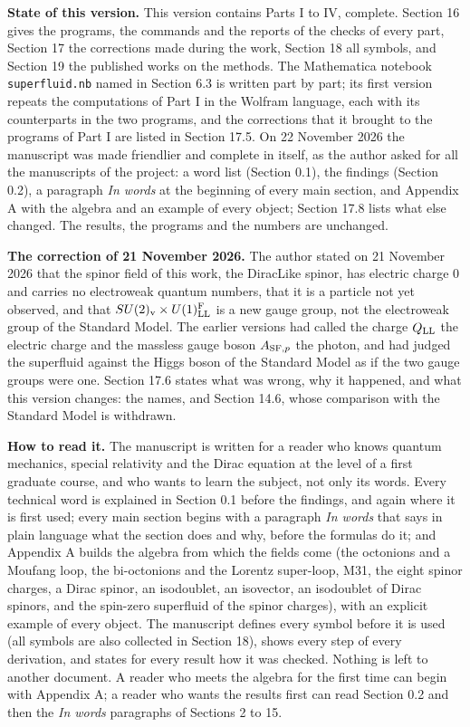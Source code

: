 \documentclass[
  10pt,
]{article}
\begin{document}
\textbf{State of this version.} This version contains Parts I to IV,
complete. Section 16 gives the programs, the commands and the reports of
the checks of every part, Section 17 the corrections made during the
work, Section 18 all symbols, and Section 19 the published works on the
methods. The Mathematica notebook \texttt{superfluid.nb} named in
Section 6.3 is written part by part; its first version repeats the
computations of Part I in the Wolfram language, each with its
counterparts in the two programs, and the corrections that it brought to
the programs of Part I are listed in Section 17.5. On 22 November 2026
the manuscript was made friendlier and complete in itself, as the author
asked for all the manuscripts of the project: a word list (Section 0.1),
the findings (Section 0.2), a paragraph \emph{In words} at the beginning
of every main section, and Appendix A with the algebra and an example of
every object; Section 17.8 lists what else changed. The results, the
programs and the numbers are unchanged.

\textbf{The correction of 21 November 2026.} The author stated on 21
November 2026 that the spinor field of this work, the DiracLike spinor,
has electric charge 0 and carries no electroweak quantum numbers, that
it is a particle not yet observed, and that
\(SU(2)_{\rm v}\times U(1)^{\rm F}_{\rm LL}\) is a new gauge group, not
the electroweak group of the Standard Model. The earlier versions had
called the charge \(Q_{\rm LL}\) the electric charge and the massless
gauge boson \(A_{{\rm SF},p}\) the photon, and had judged the superfluid
against the Higgs boson of the Standard Model as if the two gauge groups
were one. Section 17.6 states what was wrong, why it happened, and what
this version changes: the names, and Section 14.6, whose comparison with
the Standard Model is withdrawn.

\textbf{How to read it.} The manuscript is written for a reader who
knows quantum mechanics, special relativity and the Dirac equation at
the level of a first graduate course, and who wants to learn the
subject, not only its words. Every technical word is explained in
Section 0.1 before the findings, and again where it is first used; every
main section begins with a paragraph \emph{In words} that says in plain
language what the section does and why, before the formulas do it; and
Appendix A builds the algebra from which the fields come (the octonions
and a Moufang loop, the bi-octonions and the Lorentz super-loop, M31,
the eight spinor charges, a Dirac spinor, an isodoublet, an isovector,
an isodoublet of Dirac spinors, and the spin-zero superfluid of the
spinor charges), with an explicit example of every object. The
manuscript defines every symbol before it is used (all symbols are also
collected in Section 18), shows every step of every derivation, and
states for every result how it was checked. Nothing is left to another
document. A reader who meets the algebra for the first time can begin
with Appendix A; a reader who wants the results first can read Section
0.2 and then the \emph{In words} paragraphs of Sections 2 to 15.
\end{document}
